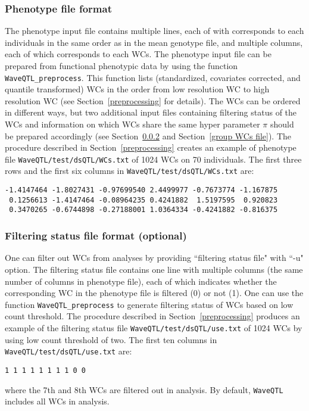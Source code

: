 \documentclass[11pt]{article}
\begin{document}
\subsubsection{Phenotype file format}
The phenotype input file contains multiple lines, each of with corresponds to each individuals in the same order as in the mean genotype file, and multiple columns, each of which corresponds to each WCs. The phenotype input file can be prepared from functional phenotypic data by using the function {\tt WaveQTL\_preprocess}. This function lists (standardized, covariates corrected, and quantile transformed) WCs in the order from low resolution WC to high resolution WC (see Section~\ref{preprocessing} for details). The WCs can be ordered in different ways, but two additional input files containing filtering status of the WCs and information on which WCs share the same hyper parameter $\pi$ should be prepared accordingly (see Section~\ref{filtering status file} and Section~\ref{group WCs file}). The procedure described in Section~\ref{preprocessing} creates an example of phenotype file {\tt WaveQTL/test/dsQTL/WCs.txt} of 1024 WCs on 70 individuals. The first three rows and the first six columns in {\tt WaveQTL/test/dsQTL/WCs.txt} are:
\begin{verbatim}
-1.4147464 -1.8027431 -0.97699540 2.4499977 -0.7673774 -1.167875  
 0.1256613 -1.4147464 -0.08964235 0.4241882  1.5197595  0.920823  
 0.3470265 -0.6744898 -0.27188001 1.0364334 -0.4241882 -0.816375 
\end{verbatim}

\subsubsection{Filtering status file format (optional)}\label{filtering status file}
One can filter out WCs from analyses by providing ``filtering status file" with ``-u" option. The filtering status file contains one line with multiple columns (the same number of columns in phenotype file), each of which indicates whether the corresponding WC in the phenotype file is filtered (0) or not (1). One can use the function {\tt WaveQTL\_preprocess} to generate filtering status of WCs based on low count threshold. The procedure described in Section~\ref{preprocessing} produces an example of the filtering status file {\tt WaveQTL/test/dsQTL/use.txt} of 1024 WCs by using low count threshold of two. The first ten columns in {\tt WaveQTL/test/dsQTL/use.txt} are:
\begin{verbatim}
1 1 1 1 1 1 1 1 0 0
\end{verbatim}
where the 7th and 8th WCs are filtered out in analysis. By default, {\tt WaveQTL} includes all WCs in analysis. 
\end{document}
